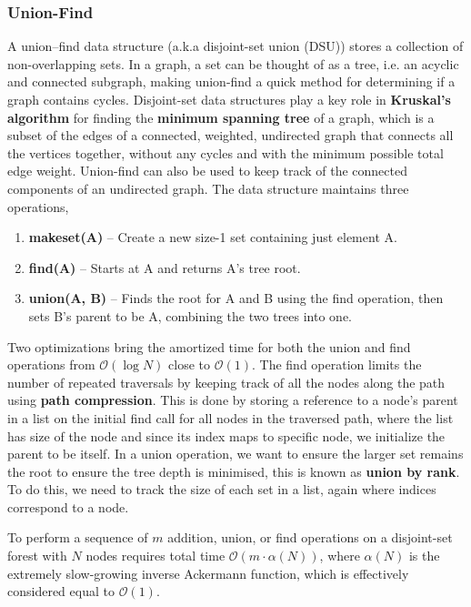 \documentclass{article}
\newcommand{\bigO}{\mathcal{O}}
\begin{document}
\subsubsection{Union-Find}
A union–find data structure (a.k.a disjoint-set union (DSU)) stores a collection of non-overlapping sets. In a graph, a set can be thought of as a tree, i.e. an acyclic and connected subgraph, making union-find a quick method for determining if a graph contains cycles. Disjoint-set data structures play a key role in \textbf{Kruskal's algorithm} for finding the \textbf{minimum spanning tree} of a graph, which is a subset of the edges of a connected, weighted, undirected graph that connects all the vertices together, without any cycles and with the minimum possible total edge weight. Union-find can also be used to keep track of the connected components of an undirected graph. The data structure maintains three operations,
\begin{enumerate}
    \item \textbf{makeset(A)} -- Create a new size-1 set containing just element A.
    \item \textbf{find(A)} -- Starts at A and returns A's tree root.
    \item \textbf{union(A, B) } --  Finds the root for A and B using the find operation, then sets B's parent to be A, combining the two trees into one.
\end{enumerate}

Two optimizations bring the amortized time for both the union and find operations from $\bigO(\log N)$ close to $\bigO(1)$. The find operation limits the number of repeated traversals by keeping track of all the nodes along the path using \textbf{path compression}. This is done by storing a reference to a node's parent in a list on the initial find call for all nodes in the traversed path, where the list has size of the node and since its index maps to specific node, we initialize the parent to be itself. In a union operation, we want to ensure the larger set  remains the root to ensure the tree depth is minimised, this is known as \textbf{union by rank}. To do this, we need to track the size of each set in a list, again where indices correspond to a node. 

To perform a sequence of $m$ addition, union, or find operations on a disjoint-set forest with $N$ nodes requires total time $\bigO(m \cdot \alpha(N))$, where $\alpha(N)$ is the extremely slow-growing inverse Ackermann function, which is effectively considered equal to $\bigO(1)$.
\end{document}
